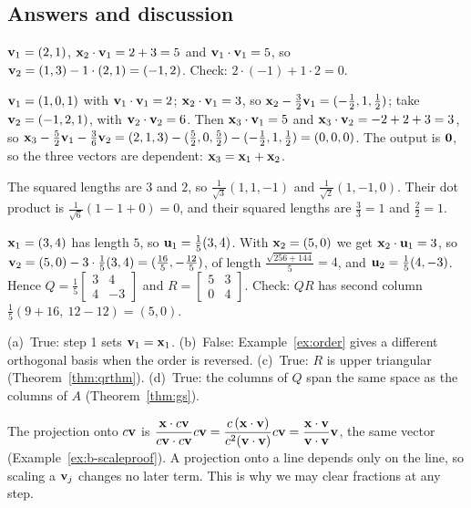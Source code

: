 \documentclass[11pt]{article}
\begin{document}
\subsection*{Answers and discussion}
\begin{description}[leftmargin=0pt,itemsep=5pt]
  \item[Knowledge Check \ref{kc:kctwo}.] $\mathbf{v}_1=(2,1)$, $\mathbf{x}_2\cdot\mathbf{v}_1=2+3=5$ and $\mathbf{v}_1\cdot\mathbf{v}_1=5$, so $\mathbf{v}_2=(1,3)-1\cdot(2,1)=(-1,2)$. Check: $2\cdot(-1)+1\cdot2=0$.
  \item[Knowledge Check \ref{kc:kcdep}.] $\mathbf{v}_1=(1,0,1)$ with $\mathbf{v}_1\cdot\mathbf{v}_1=2$; $\mathbf{x}_2\cdot\mathbf{v}_1=3$, so $\mathbf{x}_2-\tfrac32\mathbf{v}_1=(-\tfrac12,1,\tfrac12)$; take $\mathbf{v}_2=(-1,2,1)$, with $\mathbf{v}_2\cdot\mathbf{v}_2=6$. Then $\mathbf{x}_3\cdot\mathbf{v}_1=5$ and $\mathbf{x}_3\cdot\mathbf{v}_2=-2+2+3=3$, so $\mathbf{x}_3-\tfrac52\mathbf{v}_1-\tfrac36\mathbf{v}_2=(2,1,3)-(\tfrac52,0,\tfrac52)-(-\tfrac12,1,\tfrac12)=(0,0,0)$. The output is $\mathbf{0}$, so the three vectors are dependent: $\mathbf{x}_3=\mathbf{x}_1+\mathbf{x}_2$.
  \item[Knowledge Check \ref{kc:kcnorm}.] The squared lengths are $3$ and $2$, so $\tfrac1{\sqrt3}(1,1,-1)$ and $\tfrac1{\sqrt2}(1,-1,0)$. Their dot product is $\tfrac1{\sqrt6}(1-1+0)=0$, and their squared lengths are $\tfrac33=1$ and $\tfrac22=1$.
  \item[Knowledge Check \ref{kc:kcqr}.] $\mathbf{x}_1=(3,4)$ has length $5$, so $\mathbf{u}_1=\tfrac15(3,4)$. With $\mathbf{x}_2=(5,0)$ we get $\mathbf{x}_2\cdot\mathbf{u}_1=3$, so $\mathbf{v}_2=(5,0)-3\cdot\tfrac15(3,4)=(\tfrac{16}5,-\tfrac{12}5)$, of length $\tfrac{\sqrt{256+144}}5=4$, and $\mathbf{u}_2=\tfrac15(4,-3)$. Hence $Q=\tfrac15\begin{bmatrix}3&4\\4&-3\end{bmatrix}$ and $R=\begin{bmatrix}5&3\\0&4\end{bmatrix}$. Check: $QR$ has second column $\tfrac15(9+16,\ 12-12)=(5,0)$.
  \item[Knowledge Check \ref{kc:kctf}.] (a)~True: step 1 sets $\mathbf{v}_1=\mathbf{x}_1$. (b)~False: Example~\ref{ex:order} gives a different orthogonal basis when the order is reversed. (c)~True: $R$ is upper triangular (Theorem~\ref{thm:qrthm}). (d)~True: the columns of $Q$ span the same space as the columns of $A$ (Theorem~\ref{thm:gs}).
  \item[Pause and think \ref{think:scale}.] The projection onto $c\mathbf{v}$ is $\dfrac{\mathbf{x}\cdot c\mathbf{v}}{c\mathbf{v}\cdot c\mathbf{v}}c\mathbf{v}=\dfrac{c\,(\mathbf{x}\cdot\mathbf{v})}{c^2(\mathbf{v}\cdot\mathbf{v})}c\mathbf{v}=\dfrac{\mathbf{x}\cdot\mathbf{v}}{\mathbf{v}\cdot\mathbf{v}}\mathbf{v}$, the same vector (Example~\ref{ex:b-scaleproof}). A projection onto a line depends only on the line, so scaling a $\mathbf{v}_j$ changes no later term. This is why we may clear fractions at any step.

\end{description}
\end{document}
